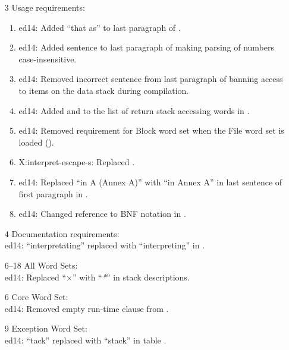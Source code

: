 \begin{itemize}
	\item[3] Usage requirements:					%
		\begin{enumerate}
		\item \textsf{ed14}: Added ``that  as'' to last paragraph
			of .
		\item \textsf{ed14}: Added sentence to last paragraph of  making
			parsing of numbers case-insensitive.
		\item \textsf{ed14}: Removed incorrect sentence from last paragraph of
			 banning access to items on the data stack during
			compilation.
		\item \textsf{ed14}: Added  and 
			to the list of return stack accessing words in .
		\item \textsf{ed14}: Removed requirement for Block word set when
			the File word set is loaded ().
		\item \textsf{X:interpret-escape-s}: Replaced .
		\item \textsf{ed14}: Replaced ``in A (Annex A)'' with ``in Annex A'' in
			last sentence of first paragraph in .
		\item \textsf{ed14}: Changed reference to BNF notation in .
		\end{enumerate}

	\item[4] Documentation requirements:			%
		~ \\
		\textsf{ed14}: ``interpretating'' replaced with ``interpreting'' in
		.
		

	\item[6--18] All Word Sets: ~\\
		\textsf{ed14}: Replaced ``$\times$'' with ``\emph{*}'' in stack descriptions.

	\item[6] Core Word Set:						%
		~\\ \textsf{ed14}: Removed empty run-time clause from .
		

	\item[9] Exception Word Set:					%
		~ \\ \textsf{ed14}: ``tack'' replaced with ``stack'' in table .
		

\end{itemize}
